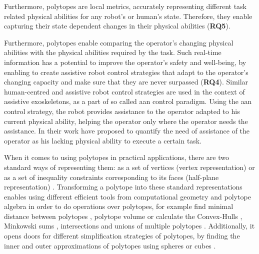 Furthermore, polytopes are local metrics, accurately representing different task related physical abilities for any robot's or human's state. Therefore, they enable capturing their state dependent changes in their physical abilities (\textbf{RQ5}).

Furthermore, polytopes enable comparing the operator's changing physical abilities with the physical abilities required by the task. Such real-time information has a potential to improve the operator's safety and well-being, by enabling to create assistive robot control strategies that adapt to the operator's changing capacity and make sure that they are never surpassed (\textbf{RQ4}). 
Similar human-centred and assistive robot control strategies are used in the context of assistive exoskeletons, as a part of so called \gls{aan} \cite{carmichael2013admittance} control paradigm. Using the \gls{aan} control strategy, the robot provides assistance to the operator adapted to his current physical ability, helping the operator only where the operator needs the assistance. In their work \citet{carmichael_towards_2011} have proposed to quantify the need of assistance of the operator as his lacking physical ability to execute a certain task.



When it comes to using polytopes in practical applications, there are two standard ways of representing them: as a set of vertices (vertex representation) or as a set of inequality constraints corresponding to its faces (half-plane representation) \cite{fukuda2004frequently}. Transforming a polytope into these standard representations enables using different efficient tools from computational geometry and polytope algebra in order to do operations over polytopes, for example find minimal distance between polytopes \cite{Ong1997gjk}, polytope volume \cite{Lawrence1991Volume} or calculate the Convex-Hulls \cite{Barber1996}, Minkowski sums \cite{BARKI2009525}, intersections and unions of multiple polytopes \cite{Tiwary2008}. Additionally, it opens doors for different simplification strategies of polytopes, by finding the inner and outer approximations of polytopes using spheres \cite{Botkin1994} or cubes \cite{BEMPORAD2004151}.

